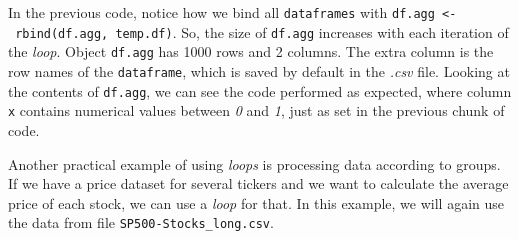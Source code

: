 \documentclass[11pt,]{book}
\newenvironment{Shaded}{\begin{snugshade}}{\end{snugshade}}
\newcommand{\KeywordTok}[1]{\textcolor[rgb]{0.27,0.27,0.27}{\textbf{#1}}}
\newcommand{\DataTypeTok}[1]{\textcolor[rgb]{0.27,0.27,0.27}{#1}}
\newcommand{\DecValTok}[1]{\textcolor[rgb]{0.06,0.06,0.06}{#1}}
\newcommand{\StringTok}[1]{\textcolor[rgb]{0.5,0.5,0.5}{#1}}
\newcommand{\CommentTok}[1]{\textcolor[rgb]{0.56,0.35,0.01}{\textit{#1}}}
\newcommand{\ControlFlowTok}[1]{\textcolor[rgb]{0.13,0.29,0.53}{\textbf{#1}}}
\newcommand{\OperatorTok}[1]{\textcolor[rgb]{0.81,0.36,0.00}{\textbf{#1}}}
\newcommand{\NormalTok}[1]{#1}
\begin{document}
In the previous code, notice how we bind all \texttt{dataframes} with
\texttt{df.agg\ \textless{}-\ rbind(df.agg,\ temp.df)}. So, the size of
\texttt{df.agg} increases with each iteration of the \emph{loop}. Object
\texttt{df.agg} has 1000 rows and 2 columns. The extra column is the row
names of the \texttt{dataframe}, which is saved by default in the
\emph{.csv} file. Looking at the contents of \texttt{df.agg}, we can see
the code performed as expected, where column \texttt{x} contains
numerical values between \emph{0} and \emph{1}, just as set in the
previous chunk of code. 

Another practical example of using \emph{loops} is processing data
according to groups. If we have a price dataset for several tickers and
we want to calculate the average price of each stock, we can use a
\emph{loop} for that. In this example, we will again use the data from
file \texttt{SP500-Stocks\_long.csv}.

\begin{Shaded}
\end{Shaded}
\end{document}

